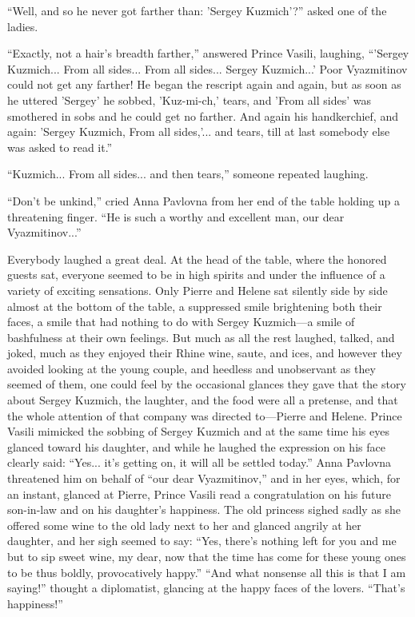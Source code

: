 ``Well, and so he never got farther than: 'Sergey Kuzmich'?''
asked one of the ladies.

``Exactly, not a hair's breadth farther,'' answered Prince
Vasili, laughing, ``'Sergey Kuzmich... From all sides... From all
sides... Sergey Kuzmich...' Poor Vyazmitinov could not get any
farther! He began the rescript again and again, but as soon as he
uttered 'Sergey' he sobbed, 'Kuz-mi-ch,' tears, and 'From all
sides' was smothered in sobs and he could get no farther. And
again his handkerchief, and again: 'Sergey Kuzmich, From all
sides,'... and tears, till at last somebody else was asked to
read it.''

``Kuzmich... From all sides... and then tears,'' someone repeated
laughing.

``Don't be unkind,'' cried Anna Pavlovna from her end of the
table holding up a threatening finger. ``He is such a worthy and
excellent man, our dear Vyazmitinov...''

Everybody laughed a great deal. At the head of the table, where
the honored guests sat, everyone seemed to be in high spirits and
under the influence of a variety of exciting sensations. Only
Pierre and Helene sat silently side by side almost at the bottom
of the table, a suppressed smile brightening both their faces, a
smile that had nothing to do with Sergey Kuzmich---a smile of
bashfulness at their own feelings.  But much as all the rest
laughed, talked, and joked, much as they enjoyed their Rhine
wine, saute, and ices, and however they avoided looking at the
young couple, and heedless and unobservant as they seemed of
them, one could feel by the occasional glances they gave that the
story about Sergey Kuzmich, the laughter, and the food were all a
pretense, and that the whole attention of that company was
directed to---Pierre and Helene. Prince Vasili mimicked the
sobbing of Sergey Kuzmich and at the same time his eyes glanced
toward his daughter, and while he laughed the expression on his
face clearly said: ``Yes... it's getting on, it will all be
settled today.'' Anna Pavlovna threatened him on behalf of ``our
dear Vyazmitinov,'' and in her eyes, which, for an instant,
glanced at Pierre, Prince Vasili read a congratulation on his
future son-in-law and on his daughter's happiness. The old
princess sighed sadly as she offered some wine to the old lady
next to her and glanced angrily at her daughter, and her sigh
seemed to say: ``Yes, there's nothing left for you and me but to
sip sweet wine, my dear, now that the time has come for these
young ones to be thus boldly, provocatively happy.'' ``And what
nonsense all this is that I am saying!''  thought a diplomatist,
glancing at the happy faces of the lovers.  ``That's happiness!''

